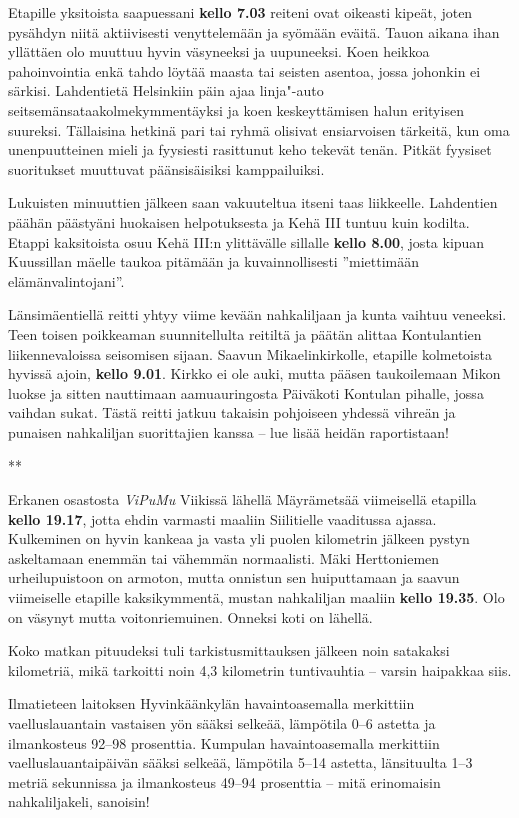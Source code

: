 \begin{multicols}{2}
Etapille yksitoista saapuessani \textbf{kello 7.03} reiteni ovat oikeasti 
kipeät, joten pysähdyn niitä aktiivisesti venyttelemään ja syömään 
eväitä. Tauon aikana ihan yllättäen olo muuttuu hyvin väsyneeksi ja 
uupuneeksi. Koen heikkoa pahoinvointia enkä tahdo löytää maasta tai seisten 
asentoa, jossa johonkin ei särkisi. Lahdentietä Helsinkiin päin ajaa 
linja"-auto seitsemänsataakolmekymmentäyksi ja koen keskeyttämisen halun 
erityisen suureksi. Tällaisina hetkinä pari tai ryhmä olisivat ensiarvoisen 
tärkeitä, kun oma unenpuutteinen mieli ja fyysiesti rasittunut keho tekevät 
tenän. Pitkät fyysiset suoritukset muuttuvat päänsisäisiksi kamppailuiksi.

Lukuisten minuuttien jälkeen saan vakuuteltua itseni taas liikkeelle. 
Lahdentien päähän päästyäni huokaisen helpotuksesta ja Kehä III tuntuu 
kuin kodilta. Etappi kaksitoista osuu Kehä III:n ylittävälle sillalle 
\textbf{kello 8.00}, josta kipuan Kuussillan mäelle taukoa pitämään ja 
kuvainnollisesti ''miettimään elämänvalintojani''. 

Länsimäentiellä reitti yhtyy viime kevään nahkaliljaan ja kunta vaihtuu 
veneeksi. Teen toisen poikkeaman suunnitellulta reitiltä ja päätän alittaa 
Kontulantien liikennevaloissa seisomisen sijaan. Saavun Mikaelinkirkolle, 
etapille kolmetoista hyvissä ajoin, \textbf{kello 9.01}. Kirkko ei ole auki, 
mutta pääsen taukoilemaan Mikon luokse ja sitten nauttimaan aamuauringosta 
Päiväkoti Kontulan pihalle, jossa vaihdan sukat. Tästä reitti jatkuu 
takaisin pohjoiseen yhdessä vihreän ja punaisen nahkaliljan suorittajien 
kanssa -- lue lisää heidän raportistaan!

{\smallskip\noindent\centering ***\par\smallskip}

Erkanen osastosta \textit{ViPuMu} Viikissä lähellä Mäyrämetsää 
viimeisellä etapilla \textbf{kello 19.17}, jotta ehdin varmasti maaliin 
Siilitielle vaaditussa ajassa. Kulkeminen on hyvin kankeaa ja vasta yli puolen 
kilometrin jälkeen pystyn askeltamaan enemmän tai vähemmän normaalisti. 
Mäki Herttoniemen urheilupuistoon on armoton, mutta onnistun sen huiputtamaan 
ja saavun viimeiselle etapille kaksikymmentä, mustan nahkaliljan maaliin 
\textbf{kello 19.35}. Olo on väsynyt mutta voitonriemuinen. Onneksi koti on 
lähellä.

Koko matkan pituudeksi tuli tarkistusmittauksen jälkeen noin satakaksi 
kilometriä, mikä tarkoitti noin 4,3 kilometrin tuntivauhtia -- varsin 
haipakkaa siis.

Ilmatieteen laitoksen Hyvinkäänkylän havaintoasemalla merkittiin 
vaelluslauantain vastaisen yön sääksi selkeää, lämpötila 0--6 astetta ja 
ilmankosteus 92--98 prosenttia. Kumpulan havaintoasemalla merkittiin 
vaelluslauantaipäivän sääksi selkeää, lämpötila 5--14 astetta, 
länsituulta 1--3 metriä sekunnissa ja ilmankosteus 49--94 prosenttia -- mitä 
erinomaisin nahkaliljakeli, sanoisin!


\end{multicols}
